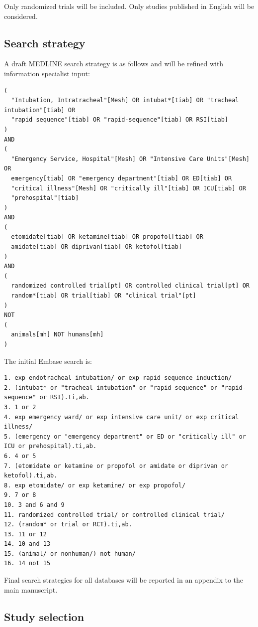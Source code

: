 \documentclass[11pt]{article}
\begin{document}
Only randomized trials will be included. Only studies published in English will be considered.

\subsection{Search strategy}

A draft MEDLINE search strategy is as follows and will be refined with information specialist input:

\begin{verbatim}
(
  "Intubation, Intratracheal"[Mesh] OR intubat*[tiab] OR "tracheal intubation"[tiab] OR
  "rapid sequence"[tiab] OR "rapid-sequence"[tiab] OR RSI[tiab]
)
AND
(
  "Emergency Service, Hospital"[Mesh] OR "Intensive Care Units"[Mesh] OR
  emergency[tiab] OR "emergency department"[tiab] OR ED[tiab] OR
  "critical illness"[Mesh] OR "critically ill"[tiab] OR ICU[tiab] OR
  "prehospital"[tiab]
)
AND
(
  etomidate[tiab] OR ketamine[tiab] OR propofol[tiab] OR
  amidate[tiab] OR diprivan[tiab] OR ketofol[tiab]
)
AND
(
  randomized controlled trial[pt] OR controlled clinical trial[pt] OR
  random*[tiab] OR trial[tiab] OR "clinical trial"[pt]
)
NOT
(
  animals[mh] NOT humans[mh]
)
\end{verbatim}

The initial Embase search is:

\begin{verbatim}
1. exp endotracheal intubation/ or exp rapid sequence induction/
2. (intubat* or "tracheal intubation" or "rapid sequence" or "rapid-sequence" or RSI).ti,ab.
3. 1 or 2
4. exp emergency ward/ or exp intensive care unit/ or exp critical illness/
5. (emergency or "emergency department" or ED or "critically ill" or ICU or prehospital).ti,ab.
6. 4 or 5
7. (etomidate or ketamine or propofol or amidate or diprivan or ketofol).ti,ab.
8. exp etomidate/ or exp ketamine/ or exp propofol/
9. 7 or 8
10. 3 and 6 and 9
11. randomized controlled trial/ or controlled clinical trial/
12. (random* or trial or RCT).ti,ab.
13. 11 or 12
14. 10 and 13
15. (animal/ or nonhuman/) not human/
16. 14 not 15
\end{verbatim}

Final search strategies for all databases will be reported in an appendix to the main manuscript.

\subsection{Study selection}
\end{document}
